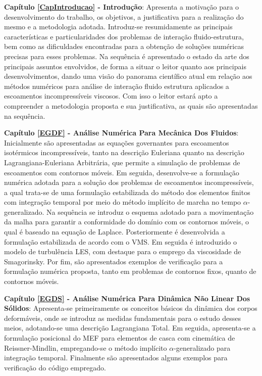     {
        \newcommand{\Capi}[2]{\textbf{Capítulo #1 - #2}:}

        \Capi{\ref{CapIntroducao}}{Introdução} Apresenta a motivação para o desenvolvimento do trabalho, os objetivos, a justificativa para a realização do mesmo e a metodologia adotada. Introduz-se resumidamente as principais características e particularidades dos problemas de interação fluido-estrutura, bem como as dificuldades encontradas para a obtenção de soluções numéricas precisas para esses problemas. Na sequência é apresentado o estado da arte dos principais assuntos envolvidos, de forma a situar o leitor quanto aos principais desenvolvimentos, dando uma visão do panorama científico atual em relação aos métodos numéricos para análise de interação fluido estrutura aplicados a escoamentos incompressíveis viscosos. Com isso o leitor estará apto a compreender a metodologia proposta e sua justificativa, as quais são apresentadas na sequência.

        \Capi{\ref{EGDF}}{Análise Numérica Para Mecânica Dos Fluidos} Inicialmente são apresentadas as equações governantes para escoamentos isotérmicos incompressíveis, tanto na descrição Euleriana quanto na descrição Lagrangiana-Euleriana Arbitrária, que permite a simulação de problemas de escoamentos com contornos móveis. Em seguida, desenvolve-se a formulação numérica adotada para a solução dos problemas de escoamentos incompressíveis, a qual trata-se de uma formulação estabilizada do método dos elementos finitos com integração temporal por meio do método implícito de marcha no tempo $\alpha$-generalizado. Na sequência se introduz o esquema adotado para a movimentação da malha para garantir a conformidade do domínio com os contornos móveis, o qual é baseado na equação de Laplace. Posteriormente é desenvolvida a formulação estabilizada de acordo com o VMS. Em seguida é introduzido o modelo de turbulência LES, com destaque para o emprego da viscosidade de Smagorinsky. Por fim, são apresentados exemplos de verificação para a formulação numérica proposta, tanto em problemas de contornos fixos, quanto de contornos móveis.

        \Capi{\ref{EGDS}}{Análise Numérica Para Dinâmica Não Linear Dos Sólidos} Apresenta-se primeiramente os conceitos básicos da dinâmica dos corpos deformáveis, onde se introduz as medidas fundamentais para o estudo desses meios, adotando-se uma descrição Lagrangiana Total. Em seguida, apresenta-se a formulação posicional do MEF para elementos de casca com cinemática de Reissner-Mindlin, empregando-se o método implícito $\alpha$-generalizado para integração temporal. Finalmente são apresentados alguns exemplos para verificação do código empregado.

}
